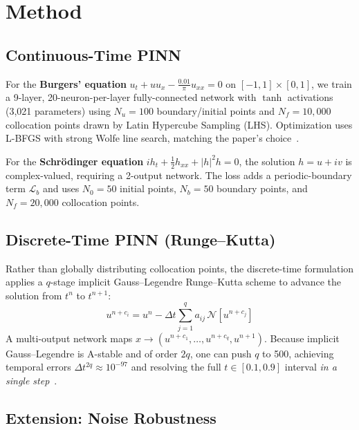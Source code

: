 \documentclass[10pt,twocolumn]{article}
\begin{document}
\section{Method}

\subsection{Continuous-Time PINN}

For the \textbf{Burgers' equation}
$u_t + u u_x - \tfrac{0.01}{\pi} u_{xx} = 0$
on $[-1,1]\times[0,1]$, we train a 9-layer, 20-neuron-per-layer
fully-connected network with $\tanh$ activations (3{,}021 parameters)
using $N_u = 100$ boundary/initial points and $N_f = 10{,}000$
collocation points drawn by Latin Hypercube Sampling (LHS).
Optimization uses L-BFGS with strong Wolfe line search, matching the
paper's choice~\cite{raissi2017}.

For the \textbf{Schr\"{o}dinger equation}
$i h_t + \tfrac{1}{2} h_{xx} + |h|^2 h = 0$,
the solution $h = u + iv$ is complex-valued, requiring a 2-output
network.  The loss adds a periodic-boundary term $\mathcal{L}_b$
and uses $N_0 = 50$ initial points, $N_b = 50$ boundary points,
and $N_f = 20{,}000$ collocation points.

\subsection{Discrete-Time PINN (Runge--Kutta)}

Rather than globally distributing collocation points, the
discrete-time formulation applies a $q$-stage implicit
Gauss--Legendre Runge--Kutta scheme to advance the solution from $t^n$
to $t^{n+1}$:
\begin{equation}
  u^{n+c_i} = u^n - \Delta t \sum_{j=1}^{q} a_{ij}\,\mathcal{N}[u^{n+c_j}]
\end{equation}
A multi-output network maps $x \to (u^{n+c_1}, \ldots, u^{n+c_q}, u^{n+1})$.
Because implicit Gauss--Legendre is A-stable and of order $2q$, one can
push $q$ to 500, achieving temporal errors
$\Delta t^{2q} \approx 10^{-97}$ and resolving the full
$t \in [0.1, 0.9]$ interval \emph{in a single step}~\cite{raissi2017}.

\subsection{Extension: Noise Robustness}
\end{document}
